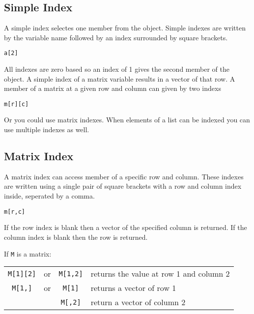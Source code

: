 \documentclass{article}
\begin{document}
\subsection{Simple Index}
A simple index selectes one member from the object.
Simple indexes are written by the variable name followed by an index surrounded
by square brackets.
\begin{verbatim}
a[2]
\end{verbatim}
All indexes are zero based so an index of 1 gives the second member of the object.
A simple index of a matrix variable results in a vector of that row.
A member of a matrix at a given row and column can given by two indexs
\begin{verbatim}
m[r][c]
\end{verbatim}
Or you could use matrix indexes.
When elements of a list can be indexed you can use multiple indexes as well.

\subsection{Matrix Index}
A matrix index can access member of a specific row and column.
These indexes are written using a single pair of square brackets with
a row and column index inside, seperated by a comma.
\begin{verbatim}
m[r,c]
\end{verbatim}
If the row index is blank then a vector of the specified column is returned.
If the column index is blank then the row is returned.

If \verb|M| is a matrix:
\begin{center}
  \begin{tabular}{cccl}
    \verb|M[1][2]| & or & \verb|M[1,2]| & returns the value at row 1 and column 2 \\
    \verb|M[1,]| & or & \verb|M[1]| & returns a vector of row 1 \\
    && \verb|M[,2]| & return a vector of column 2 \\
  \end{tabular}
\end{center}
\end{document}
